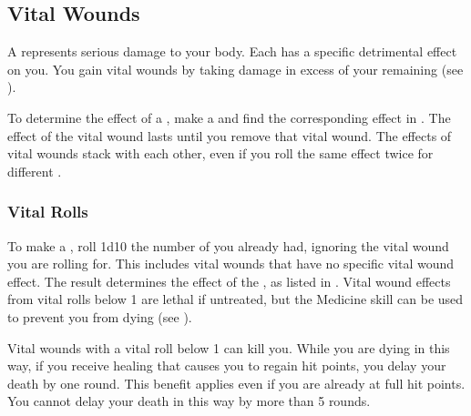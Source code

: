     \subsection{Vital Wounds}\label{Vital Wounds}
        A  represents serious damage to your body.
        Each  has a specific detrimental effect on you.
        You gain vital wounds by taking damage in excess of your remaining  (see ).

        To determine the effect of a , make a  and find the corresponding effect in .
        The effect of the vital wound lasts until you remove that vital wound.
        The effects of vital wounds stack with each other, even if you roll the same effect twice for different .

        \subsubsection{Vital Rolls}\label{Vital Rolls}
            To make a , roll 1d10 \sub the number of  you already had, ignoring the vital wound you are rolling for.
            This includes vital wounds that have no specific vital wound effect.
            The result determines the effect of the , as listed in .
            Vital wound effects from vital rolls below 1 are lethal if untreated, but the Medicine skill can be used to prevent you from dying (see ).

             Vital wounds with a vital roll below 1 can kill you.
            While you are dying in this way, if you receive healing that causes you to regain hit points, you delay your death by one round.
            This benefit applies even if you are already at full hit points.
            You cannot delay your death in this way by more than 5 rounds.

